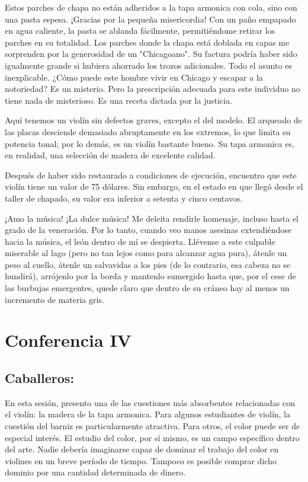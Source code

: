 \documentclass[12pt]{book}
\begin{document}
Estos parches de chapa no están adheridos a la tapa armonica con cola, sino con una pasta espesa. ¡Gracias por la pequeña misericordia! Con un paño empapado en agua caliente, la pasta se ablanda fácilmente, permitiéndome retirar los parches en su totalidad. Los parches donde la chapa está doblada en capas me sorprenden por la generosidad de un "Chicagoano". Su factura podría haber sido igualmente grande si hubiera ahorrado los trozos adicionales. Todo el asunto es inexplicable. ¿Cómo puede este hombre vivir en Chicago y escapar a la notoriedad? Es un misterio. Pero la prescripción adecuada para este individuo no tiene nada de misterioso. Es una receta dictada por la justicia.

Aquí tenemos un violín sin defectos graves, excepto el del modelo. El arqueado de las placas desciende demasiado abruptamente en los extremos, lo que limita su potencia tonal; por lo demás, es un violín bastante bueno. Su tapa armonica es, en realidad, una selección de madera de excelente calidad.

Después de haber sido restaurado a condiciones de ejecución, encuentro que este violín tiene un valor de 75 dólares. Sin embargo, en el estado en que llegó desde el taller de chapado, su valor era inferior a setenta y cinco centavos. 

¡Amo la música! ¡La dulce música! Me deleita rendirle homenaje, incluso hasta el grado de la veneración. Por lo tanto, cuando veo manos asesinas extendiéndose hacia la música, el león dentro de mí se despierta. Llévense a este culpable miserable al lago (pero no tan lejos como para alcanzar agua pura), átenle un peso al cuello, átenle un salvavidas a los pies (de lo contrario, esa cabeza no se hundirá), arrójenlo por la borda y mantenlo sumergido hasta que, por el cese de las burbujas emergentes, quede claro que dentro de su cráneo hay al menos un incremento de materia gris.

\chapter{Conferencia IV}

\section*{Caballeros:}

En esta sesión, presento una de las cuestiones más absorbentes relacionadas con el violín: la madera de la tapa armonica. Para algunos estudiantes de violín, la cuestión del barniz es particularmente atractiva. Para otros, el color puede ser de especial interés. El estudio del color, por sí mismo, es un campo específico dentro del arte. Nadie debería imaginarse capaz de dominar el trabajo del color en violines en un breve período de tiempo. Tampoco es posible comprar dicho dominio por una cantidad determinada de dinero.
\end{document}
